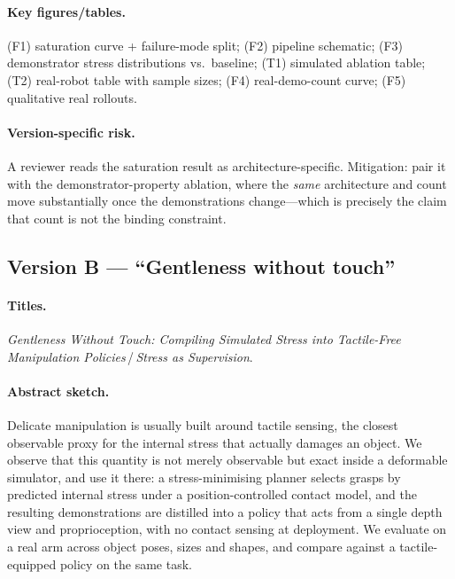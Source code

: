 \paragraph{Key figures/tables.}
(F1) saturation curve + failure-mode split; (F2) pipeline schematic; (F3) demonstrator stress
distributions vs.\ baseline; (T1) simulated ablation table; (T2) real-robot table with
sample sizes; (F4) real-demo-count curve; (F5) qualitative real rollouts.

\paragraph{Version-specific risk.} A reviewer reads the saturation result as
architecture-specific. Mitigation: pair it with the demonstrator-property ablation, where the
\emph{same} architecture and count move substantially once the demonstrations change---which
is precisely the claim that count is not the binding constraint.

\subsection{Version B --- ``Gentleness without touch''}
\label{sec:outlines:B}

\paragraph{Titles.}
\emph{Gentleness Without Touch: Compiling Simulated Stress into Tactile-Free Manipulation
Policies}\,/\,\emph{Stress as Supervision}.

\paragraph{Abstract sketch.}
Delicate manipulation is usually built around tactile sensing, the closest observable proxy
for the internal stress that actually damages an object. We observe that this quantity is not
merely observable but exact inside a deformable simulator, and use it there: a
stress-minimising planner selects grasps by predicted internal stress under a
position-controlled contact model, and the resulting demonstrations are distilled into a
policy that acts from a single depth view and proprioception, with no contact sensing at
deployment. We evaluate on a real arm across object poses, sizes and shapes, and compare
against a tactile-equipped policy on the same task.

